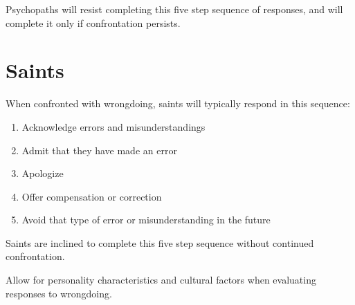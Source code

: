 \documentclass[a5paper,10pt,english]{book}
\begin{document}
\sphinxAtStartPar
Psychopaths will resist completing this five step sequence of responses, and will complete it only if confrontation persists.


\section{Saints}
\label{\detokenize{checklist:saints}}
\sphinxAtStartPar
When confronted with wrong\sphinxhyphen{}doing, saints will typically respond in this sequence:
\begin{enumerate}
%
\item {} 
\sphinxAtStartPar
Acknowledge errors and misunderstandings

\item {} 
\sphinxAtStartPar
Admit that they have made an error

\item {} 
\sphinxAtStartPar
Apologize

\item {} 
\sphinxAtStartPar
Offer compensation or correction

\item {} 
\sphinxAtStartPar
Avoid that type of error or misunderstanding in the future

\end{enumerate}

\sphinxAtStartPar
Saints are inclined to complete this five step sequence without continued confrontation.

\sphinxAtStartPar
Allow for personality characteristics and cultural factors when evaluating responses to wrong\sphinxhyphen{}doing.

\bgroup\footnotesize
\end{document}
